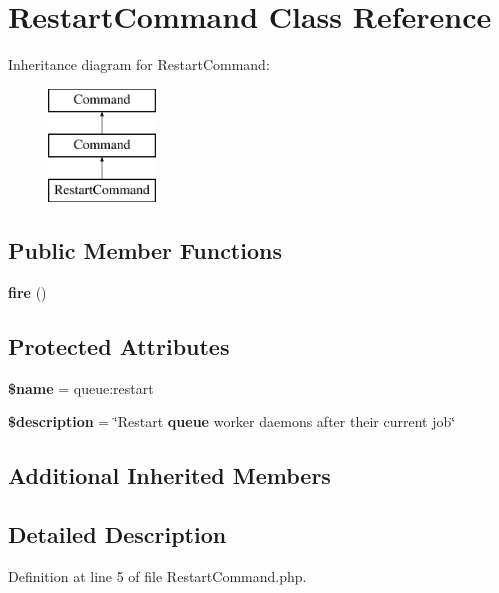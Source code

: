 \section{Restart\+Command Class Reference}
\label{class_illuminate_1_1_queue_1_1_console_1_1_restart_command}
Inheritance diagram for Restart\+Command\+:\begin{figure}[H]
\begin{center}
\leavevmode
\includegraphics[height=3.000000cm]{class_illuminate_1_1_queue_1_1_console_1_1_restart_command}
\end{center}
\end{figure}
\subsection*{Public Member Functions}
\begin{DoxyCompactItemize}
\item 
{\bf fire} ()
\end{DoxyCompactItemize}
\subsection*{Protected Attributes}
\begin{DoxyCompactItemize}
\item 
{\bf \$name} = \textquotesingle{}queue\+:restart\textquotesingle{}
\item 
{\bf \$description} = \char`\"{}Restart {\bf queue} worker daemons after their current job\char`\"{}
\end{DoxyCompactItemize}
\subsection*{Additional Inherited Members}


\subsection{Detailed Description}


Definition at line 5 of file Restart\+Command.\+php.



